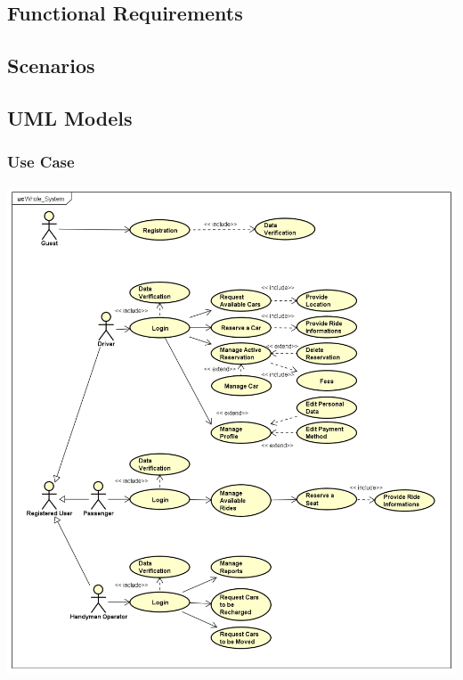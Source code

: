 \documentclass{article}
\begin{document}
		\subsection{Functional Requirements}
		
		
		\pagebreak
		\subsection{Scenarios}
		
		\pagebreak
		\subsection{UML Models}
		\subsubsection{Use Case}
		\begin{center}
			\includegraphics[width=0.9\linewidth]{"img/use-case-whole-system"}
		\end{center}
		\pagebreak
		
\end{document}
